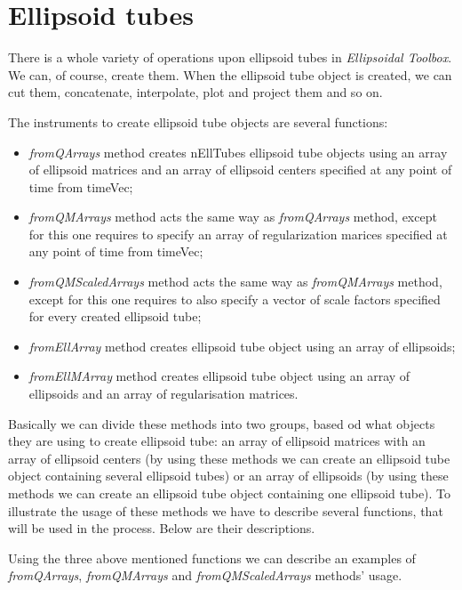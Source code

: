 \documentclass[letterpaper,10pt,english]{sphinxmanual}
\begin{document}
\section{Ellipsoid tubes}
\label{chap_ellTube:ellipsoid-tubes}
There is a whole variety of operations upon ellipsoid tubes in \emph{Ellipsoidal Toolbox}. We can, of course, create them. When the ellipsoid tube object is created, we can cut them, concatenate, interpolate, plot and project them and so on.

The instruments to create ellipsoid tube objects are several functions:
\begin{itemize}
\item {} 
\emph{fromQArrays} method creates nEllTubes ellipsoid tube objects using an array of ellipsoid matrices and an array of ellipsoid centers specified at any point of time from timeVec;

\item {} 
\emph{fromQMArrays} method acts the same way as \emph{fromQArrays} method, except for this one requires to specify an array of regularization marices specified at any point of time from timeVec;

\item {} 
\emph{fromQMScaledArrays} method acts the same way as \emph{fromQMArrays} method, except for this one requires to also specify a vector of scale factors specified for every created ellipsoid tube;

\item {} 
\emph{fromEllArray} method creates ellipsoid tube object using an array of ellipsoids;

\item {} 
\emph{fromEllMArray} method creates ellipsoid tube object using an array of ellipsoids and an array of regularisation matrices.

\end{itemize}

Basically we can divide these methods into two groups, based od what objects they are using to create ellipsoid tube: an array of ellipsoid matrices with an array of ellipsoid centers (by using these methods we can create an ellipsoid tube object containing several ellipsoid tubes) or an array of ellipsoids (by using these methods we can create an ellipsoid tube object containing one ellipsoid tube). To illustrate the usage of these methods we have to describe several functions, that will be used in the process. Below are their descriptions.

Using the three above mentioned functions we can describe an examples of \emph{fromQArrays}, \emph{fromQMArrays} and \emph{fromQMScaledArrays} methods' usage.
\end{document}
